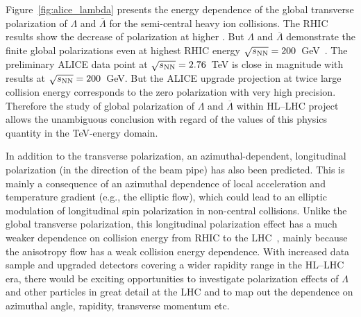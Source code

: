 Figure~\ref{fig:alice_lambda} presents the energy dependence of the global 
  transverse polarization of $\Lambda$ and $\overline{\Lambda}$ for the 
  semi-central heavy ion collisions. 
The RHIC results show the decrease of polarization at higher \snn. 
But $\Lambda$ and $\overline{\Lambda}$ demonstrate the finite global 
  polarizations even at highest RHIC energy $\sqrt{s_{\mathrm{NN}}}=200$~GeV~\cite{PRC-98-014910-2018}. 
The preliminary ALICE data point at $\sqrt{s_{\mathrm{NN}}}=2.76$~TeV is close in magnitude 
  with results at $\sqrt{s_{\mathrm{NN}}}=200$~GeV. 
But the ALICE upgrade projection at twice large collision energy corresponds 
  to the zero polarization with very high precision. 
Therefore the study of global polarization of $\Lambda$ and $\overline{\Lambda}$ 
  within HL--LHC project allows the unambiguous conclusion with regard of the 
  values of this physics quantity in the TeV-energy domain. 

In addition to the transverse polarization, an azimuthal-dependent, 
  longitudinal polarization (in the direction of the beam pipe) has 
  also been predicted. 
This is mainly a consequence of an azimuthal dependence of local acceleration 
  and temperature gradient (e.g., the elliptic flow), which could lead to an 
  elliptic modulation of longitudinal spin polarization in 
  non-central collisions. 
Unlike the global transverse polarization, this longitudinal polarization 
  effect has a much weaker dependence on collision energy from RHIC to 
  the LHC~\cite{Karpenko:2017dui}, mainly because the anisotropy flow has a 
  weak collision energy dependence. 
With increased data sample and upgraded detectors covering a wider rapidity 
  range in the HL--LHC era, there would be exciting opportunities to 
  investigate polarization effects of $\Lambda$ and other particles in great 
  detail at the LHC and to map out the dependence on azimuthal angle, 
  rapidity, transverse momentum etc.

